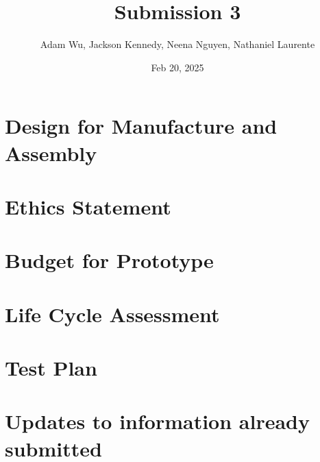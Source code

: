 \documentclass{article}
\title{Submission 3}
\author{Adam Wu, Jackson Kennedy, Neena Nguyen, Nathaniel Laurente}
\date{Feb 20, 2025}
\begin{document}
\maketitle

\tableofcontents
\section{Design for Manufacture and Assembly}
\section{Ethics Statement}
\section{Budget for Prototype}
\section{Life Cycle Assessment}
\section{Test Plan}
\section{Updates to information already submitted}
\end{document}
